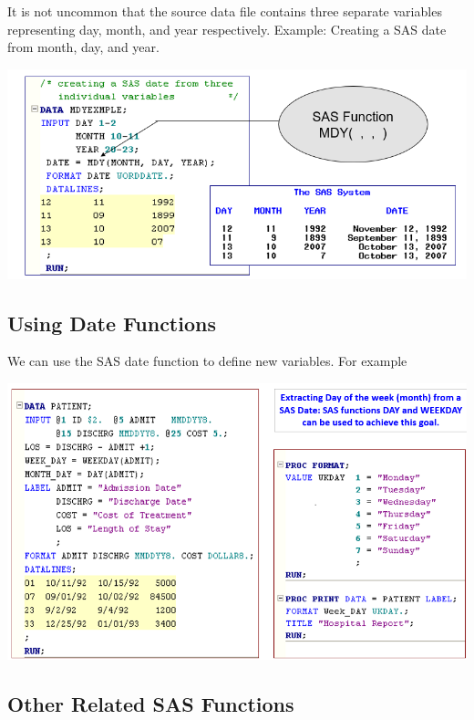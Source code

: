 \documentclass[
]{book}
\begin{document}
It is not uncommon that the source data file contains three separate
variables representing day, month, and year respectively. Example:
Creating a SAS date from month, day, and year.

\begin{center}\includegraphics[width=1\linewidth]{img09/w09-dateFunction} \end{center}

\hypertarget{using-date-functions}{%
\subsection{Using Date Functions}\label{using-date-functions}}

We can use the SAS date function to define new variables. For example

\begin{center}\includegraphics[width=1\linewidth]{img09/w09-DateFun4NewVar} \end{center}

\hypertarget{other-related-sas-functions}{%
\subsection{Other Related SAS Functions}\label{other-related-sas-functions}}
\end{document}
